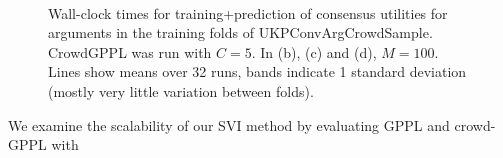 \begin{figure}[ht]
\centering
{}
\\
\caption{
    Wall-clock times for training+prediction of consensus utilities for arguments 
    in the training folds of
    UKPConvArgCrowdSample. CrowdGPPL was run with $C=5$. In (b), (c) and (d),  $M=100$.
    Lines show means over 32 runs,
     bands indicate 1 standard deviation (mostly very little variation between folds).
}
\end{figure}
We examine the scalability of our SVI method by evaluating GPPL and crowd-GPPL with
